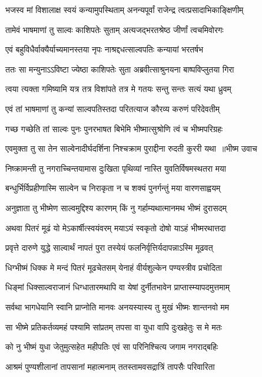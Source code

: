 \twolineshloka
{भजस्व मां विशालाक्ष स्वयं कन्यामुपस्थिताम्}
{अनन्यपूर्वां राजेन्द्र त्वत्प्रसादाभिकाङ्क्षिणीम्}


\twolineshloka
{तामेवं भाषमाणां तु साल्वः काशिपतेः सुताम्}
{अत्यजद्भरतश्रेष्ठ जीर्णां त्वचमिवोरगः}


\twolineshloka
{एवं बहुविधैर्वाक्यैर्याच्यमानस्तया नृपः}
{नाश्रद्दधत्साल्वपतिः कन्यायां भरतर्षभ}


\twolineshloka
{ततः सा मन्युनाऽऽविष्टा ज्येष्ठा काशिपतेः सुता}
{अब्रवीत्साश्रुनयना बाष्पविप्लुतया गिरा}


\twolineshloka
{त्वया त्यक्ता गमिष्यामि यत्र तत्र विशांपते}
{तत्र मे गतयः सन्तु सन्तः सत्यं यथा ध्रुवम्}


\twolineshloka
{एवं तां भाषमाणां तु कन्यां साल्वपतिस्तदा}
{परितत्याज कौरव्य करुणं परिदेवतीम्}


\twolineshloka
{गच्छ गच्छेति तां साल्वः पुनः पुनरभाषत}
{बिभेमि भीष्मात्सुश्रोणि त्वं च भीष्मपरिग्रहः}


\threelineshloka
{एवमुक्ता तु सा तेन साल्वेनादीर्घदर्शिना}
{निश्चक्राम पुराद्दीना रुदती कुररी यथा ॥भीष्म उवाच}
{}


\twolineshloka
{निष्क्रामन्ती तु नगराच्चिन्तयामास दुःखिता}
{पृथिव्यां नास्ति युवतिर्विषमस्थतरा मया}


\twolineshloka
{बन्धुर्भिर्विप्रहीणास्मि साल्वेन च निराकृता}
{न च शक्यं पुनर्गन्तुं मया वारणसाह्वयम्}


\twolineshloka
{अनुज्ञाता तु भीष्मेण साल्वमुद्दिश्य कारणम्}
{किं नु गर्हाम्यथात्मानमथ भीष्मं दुरासदम्}


\twolineshloka
{अथवा पितरं मूढं यो मेऽकार्षीत्स्वयंवरम्}
{मयाऽयं स्वकृतो दोषो याऽहं भीष्मरथात्तदा}


\twolineshloka
{प्रवृत्ते दारुणे युद्धे साल्वार्थं नापतं पुरा}
{तस्येयं फलनिर्वृत्तिर्यदापन्नाऽस्मि मूढवत्}


\twolineshloka
{धिग्भीष्मं धिक्क मे मन्दं पितरं मूढचेतसम्}
{येनाहं वीर्यशुल्केन पण्यस्त्रीव प्रचोदिता}


\twolineshloka
{धिङ्मां धिक्साल्वराजानं धिग्धातारमथापि वा}
{येषां दुर्नीतभावेन प्राप्तास्म्यापदमुत्तमाम्}


\twolineshloka
{सर्वथा भागधेयानि स्वानि प्राप्नोति मानवः}
{अनयस्यास्य तु मुखं भीष्मः शान्तनवो मम}


\twolineshloka
{सा भीष्मे प्रतिकर्तव्यमहं पश्यामि सांप्रतम्}
{तपसा वा युधा वापि दुःखहेतुः स मे मतः}


\twolineshloka
{को नु भीष्मं युधा जेतुमुत्सहेत महीपतिः}
{एवं सा परिनिश्चित्य जगाम नगराद्बहिः}


\twolineshloka
{आश्रमं पुण्यशीलानां तापसानां महात्मनाम्}
{ततस्तामवसद्रात्रिं तापसैः परिवारिता}


